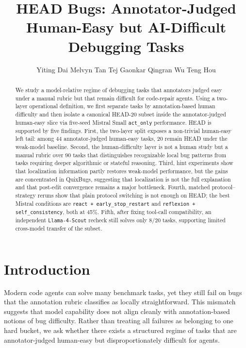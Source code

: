 \documentclass{article}
\title{HEAD Bugs: Annotator-Judged Human-Easy but AI-Difficult Debugging Tasks}
\author{
Yiting Dai
\And
Melvyn Tan
\And
Tej Gaonkar
\And
Qingran Wu
\And
Teng Hou
}
\begin{document}
\maketitle

\begin{abstract}
We study a model-relative regime of debugging tasks that annotators judged easy under a manual rubric but that remain difficult for code-repair agents. Using a two-layer operational definition, we first separate tasks by annotation-based human difficulty and then isolate a canonical HEAD-20 subset inside the annotator-judged human-easy slice via five-seed Mistral Small \texttt{act\_only} performance. HEAD is supported by five findings. First, the two-layer split exposes a non-trivial human-easy left tail: among 44 annotator-judged human-easy tasks, 20 remain HEAD under the weak-model baseline. Second, the human-difficulty layer is not a human study but a manual rubric over 90 tasks that distinguishes recognizable local bug patterns from tasks requiring deeper algorithmic or stateful reasoning. Third, hint experiments show that localization information partly restores weak-model performance, but the gains are concentrated in QuixBugs, suggesting that localization is not the full explanation and that post-edit convergence remains a major bottleneck. Fourth, matched protocol--strategy reruns show that plain protocol switching is not enough on HEAD; the best Mistral conditions are \texttt{react + early\_stop\_restart} and \texttt{reflexion + self\_consistency}, both at 45\%. Fifth, after fixing tool-call compatibility, an independent \texttt{Llama-4-Scout} recheck still solves only 8/20 tasks, supporting limited cross-model transfer of the subset.
\end{abstract}

\section{Introduction}

Modern code agents can solve many benchmark tasks, yet they still fail on bugs that the annotation rubric classifies as locally straightforward. This mismatch suggests that model capability does not align cleanly with annotation-based notions of bug difficulty. Rather than treating all failures as belonging to one hard bucket, we ask whether there exists a structured regime of tasks that are annotator-judged human-easy but disproportionately difficult for agents.
\end{document}
